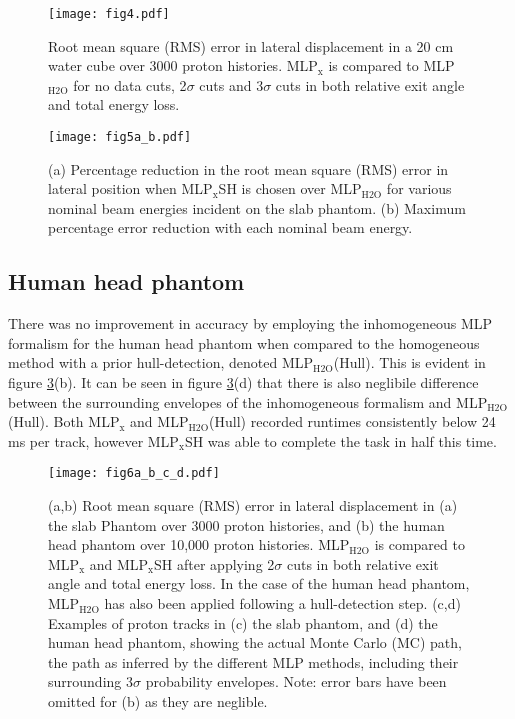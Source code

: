 \documentclass[preprint,times]{elsarticle}
\newcommand{\Fig}[1]{figure #1} %
\begin{document}
\begin{figure}[t]
\centering
\texttt{[image: fig4.pdf]}
\caption{Root mean square (RMS) error in lateral displacement in a 20 cm water cube over 3000 proton histories. MLP$_\mathrm{x}$ is compared to MLP$_\mathrm{H2O}$ for no data cuts, 2$\sigma$ cuts and 3$\sigma$ cuts in both relative exit angle and total energy loss.}\label{laterr_water}
\end{figure}

\begin{figure}[t]
\centering
\texttt{[image: fig5a\_b.pdf]}
\caption{(a) Percentage reduction in the root mean square (RMS) error in lateral position when MLP$_\mathrm{x}$SH is chosen over MLP$_\mathrm{H2O}$ for various nominal beam energies incident on the slab phantom. (b) Maximum percentage error reduction with each nominal beam energy.}\label{errorreductions}
\end{figure}

\subsection{Human head phantom}

There was no improvement in accuracy by employing the inhomogeneous MLP formalism for the human head phantom when compared to the homogeneous method with a prior hull-detection, denoted MLP$_\mathrm{H2O}$(Hull). This is evident in \Fig{\ref{slabs}}(b). It can be seen in \Fig{\ref{slabs}}(d) that there is also neglibile difference between the surrounding envelopes of the inhomogeneous formalism and MLP$_\mathrm{H2O}$(Hull). Both MLP$_\mathrm{x}$ and MLP$_\mathrm{H2O}$(Hull) recorded runtimes consistently below 24 ms per track, however MLP$_\mathrm{x}$SH was able to complete the task in half this time.

\begin{figure}[t]
\centering
\texttt{[image: fig6a\_b\_c\_d.pdf]}
\caption{(a,b) Root mean square (RMS) error in lateral displacement in (a) the slab Phantom over 3000 proton histories, and (b) the human head phantom over 10,000 proton histories. MLP$_\mathrm{H2O}$ is compared to MLP$_\mathrm{x}$ and MLP$_\mathrm{x}$SH after applying 2$\sigma$ cuts in both relative exit angle and total energy loss. In the case of the human head phantom, MLP$_\mathrm{H2O}$ has also been applied following a hull-detection step. (c,d) Examples of proton tracks in (c) the slab phantom, and (d) the human head phantom, showing the actual Monte Carlo (MC) path, the path as inferred by the different MLP methods, including their surrounding 3$\sigma$ probability envelopes. Note: error bars have been omitted for (b) as they are neglible.}\label{slabs}
\end{figure}
\end{document}
